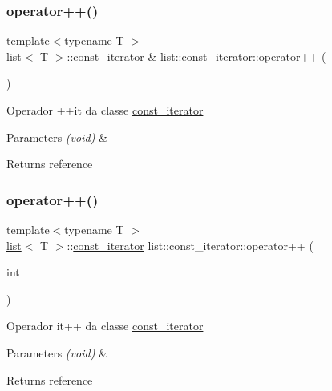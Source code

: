 \subsubsection{\texorpdfstring{operator++()}{operator++()}\hspace{0.1cm}{\footnotesize\ttfamily [1/2]}}
{\footnotesize\ttfamily template$<$typename T $>$ \\
\mbox{\hyperlink{classsc_1_1list}{list}}$<$ T $>$\+::\mbox{\hyperlink{classsc_1_1list_1_1const__iterator}{const\+\_\+iterator}} \& list\+::const\+\_\+iterator\+::operator++ (\begin{DoxyParamCaption}{ }\end{DoxyParamCaption})}

Operador ++it da classe \mbox{\hyperlink{classsc_1_1list_1_1const__iterator}{const\+\_\+iterator}} 
\begin{DoxyParams}{Parameters}
{\em (void)} & \\
\hline
\end{DoxyParams}
\begin{DoxyReturn}{Returns}
reference 
\end{DoxyReturn}
\mbox{\label{classsc_1_1list_1_1const__iterator_a6b724b61cbc4087c43836dced5eed52f}} 
\subsubsection{\texorpdfstring{operator++()}{operator++()}\hspace{0.1cm}{\footnotesize\ttfamily [2/2]}}
{\footnotesize\ttfamily template$<$typename T $>$ \\
\mbox{\hyperlink{classsc_1_1list}{list}}$<$ T $>$\+::\mbox{\hyperlink{classsc_1_1list_1_1const__iterator}{const\+\_\+iterator}} list\+::const\+\_\+iterator\+::operator++ (\begin{DoxyParamCaption}\item[{int}]{ }\end{DoxyParamCaption})}

Operador it++ da classe \mbox{\hyperlink{classsc_1_1list_1_1const__iterator}{const\+\_\+iterator}} 
\begin{DoxyParams}{Parameters}
{\em (void)} & \\
\hline
\end{DoxyParams}
\begin{DoxyReturn}{Returns}
reference 
\end{DoxyReturn}
\mbox{\label{classsc_1_1list_1_1const__iterator_aeb7c02bf76c6734253d09a5e2da94d9f}} 

